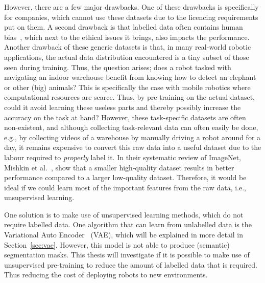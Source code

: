 However, there are a few major drawbacks. One of these drawbacks is specifically for companies, which cannot use these datasets due to the licencing requirements put on them. A second drawback is that labelled data often contains human bias~\cite{yang2020towards}, which next to the ethical issues it brings, also impacts the performance. Another drawback of these generic datasets is that, in many real-world robotic applications, the actual data distribution encountered is a tiny subset of those seen during training. Thus, the question arises; does a robot tasked with navigating an indoor warehouse benefit from knowing how to detect an elephant or other (big) animals? This is specifically the case with mobile robotics where computational resources are scarce. Thus, by pre-training on the actual dataset, could it avoid learning these useless parts and thereby possibly increase the accuracy on the task at hand? However, these task-specific datasets are often non-existent, and although collecting task-relevant data can often easily be done, e.g., by collecting videos of a warehouse by manually driving a robot around for a day, it remains expensive to convert this raw data into a useful dataset due to the labour required to \emph{properly} label it. In their systematic review of ImageNet, Mishkin et al.~\cite{MISHKIN201711}, show that a smaller high-quality dataset results in better performance compared to a larger low-quality dataset. Therefore, it would be ideal if we could learn most of the important features from the raw data, i.e., unsupervised learning.

One solution is to make use of unsupervised learning methods, which do not require labelled data. One algorithm that can learn from unlabelled data is the Variational Auto Encoder~\cite{kingma2014autoencodingvariationalbayes} (VAE), which will be explained in more detail in Section~\ref{sec:vae}. However, this model is not able to produce (semantic) segmentation masks. This thesis will investigate if it is possible to make use of unsupervised pre-training to reduce the amount of labelled data that is required. Thus reducing the cost of deploying robots to new environments.

